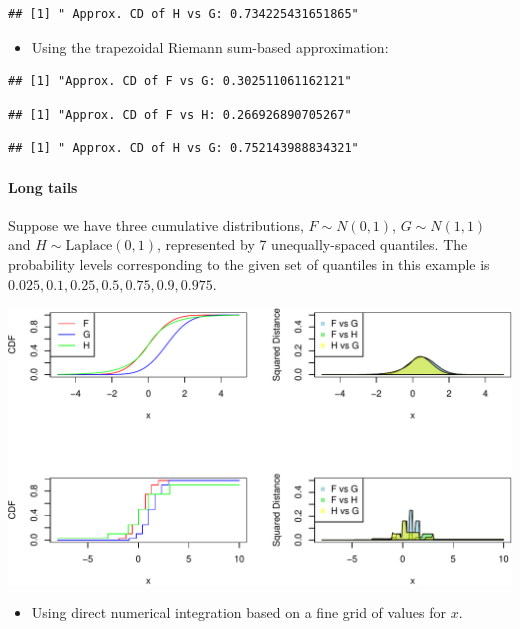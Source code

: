 \documentclass[
]{article}
\providecommand{\tightlist}{%
  \setlength{\itemsep}{0pt}\setlength{\parskip}{0pt}}
\begin{document}
\begin{verbatim}
## [1] " Approx. CD of H vs G: 0.734225431651865"
\end{verbatim}

\begin{itemize}
\tightlist
\item
  Using the trapezoidal Riemann sum-based approximation:
\end{itemize}

\begin{verbatim}
## [1] "Approx. CD of F vs G: 0.302511061162121"
\end{verbatim}

\begin{verbatim}
## [1] "Approx. CD of F vs H: 0.266926890705267"
\end{verbatim}

\begin{verbatim}
## [1] " Approx. CD of H vs G: 0.752143988834321"
\end{verbatim}

\hypertarget{long-tails}{%
\paragraph{Long tails}\label{long-tails}}

Suppose we have three cumulative distributions, \(F\sim N(0,1)\),
\(G\sim N(1,1)\) and \(H\sim \text{Laplace}(0,1)\), represented by 7
unequally-spaced quantiles. The probability levels corresponding to the
given set of quantiles in this example is
\(0.025,0.1,0.25,0.5,0.75,0.9,0.975\).

\includegraphics{cd_approx_2_files/figure-latex/unnamed-chunk-31-1.pdf}

\begin{itemize}
\tightlist
\item
  Using direct numerical integration based on a fine grid of values for
  \(x\).
\end{itemize}
\end{document}
